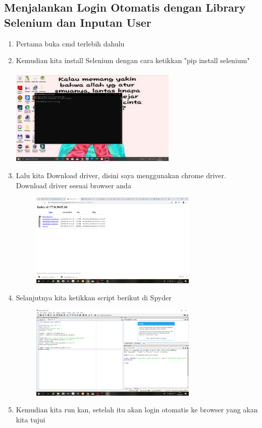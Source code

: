 \documentclass{article}
\begin{document}
\subsection{Menjalankan Login Otomatis dengan Library Selenium dan Inputan User}
\begin{enumerate}
    \item Pertama buka cmd terlebih dahulu
    \newpage \item Kemudian kita install Selenium dengan cara ketikkan "pip install selenium"
        \paragraph{}
            \centerline{\includegraphics[width=8cm]{image/pipinstallsel.png}}
    \item Lalu kita Download driver, disini saya menggunakan chrome driver. Download driver sesuai browser anda
        \begin{figure}[h]
            \centerline{\includegraphics[width=8cm]{image/chromedriver.png}}
        \end{figure}
    \item Selanjutnya kita ketikkan script berikut di Spyder
        \begin{figure}[h]
            \centerline{\includegraphics[width=8cm]{image/scriptsele.png}}
        \end{figure}
    \item Kemudian kita run kan, setelah itu akan login otomatis ke browser yang akan kita tujui
\end{enumerate}
\end{document}
